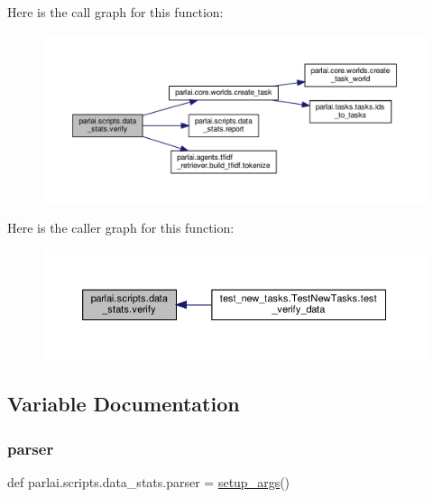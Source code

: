 Here is the call graph for this function\+:
\nopagebreak
\begin{figure}[H]
\begin{center}
\leavevmode
\includegraphics[width=350pt]{namespaceparlai_1_1scripts_1_1data__stats_a3bf0a490abe0b6ea608d1f9ece194c79_cgraph}
\end{center}
\end{figure}
Here is the caller graph for this function\+:
\nopagebreak
\begin{figure}[H]
\begin{center}
\leavevmode
\includegraphics[width=350pt]{namespaceparlai_1_1scripts_1_1data__stats_a3bf0a490abe0b6ea608d1f9ece194c79_icgraph}
\end{center}
\end{figure}


\subsection{Variable Documentation}
\mbox{\label{namespaceparlai_1_1scripts_1_1data__stats_af1cc1fdf5289b1dfc8277f9de43ff109}} 
\subsubsection{\texorpdfstring{parser}{parser}}
{\footnotesize\ttfamily def parlai.\+scripts.\+data\+\_\+stats.\+parser = \hyperlink{namespaceparlai_1_1scripts_1_1data__stats_add47fb96d75895f4c21d9e310cb1df40}{setup\+\_\+args}()}



